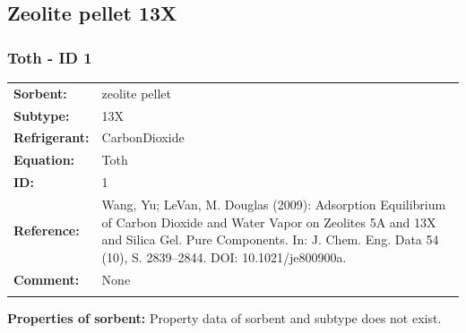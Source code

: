 \subsection{Zeolite pellet 13X}
%
\subsubsection{Toth - ID 1}
%
\begin{tabular}[l]{|lp{11.5cm}|}
\hline
\addlinespace

\textbf{Sorbent:} & zeolite pellet \\
\textbf{Subtype:} & 13X \\
\textbf{Refrigerant:} & CarbonDioxide \\
\textbf{Equation:} & Toth \\
\textbf{ID:} & 1 \\
\textbf{Reference:} & Wang, Yu; LeVan, M. Douglas (2009): Adsorption Equilibrium of Carbon Dioxide and Water Vapor on Zeolites 5A and 13X and Silica Gel. Pure Components. In: J. Chem. Eng. Data 54 (10), S. 2839–2844. DOI: 10.1021/je800900a. \\
\textbf{Comment:} & None \\

\addlinespace
\hline
\end{tabular}
\newline

\textbf{Properties of sorbent:}
\newline
%
Property data of sorbent and subtype does not exist.

